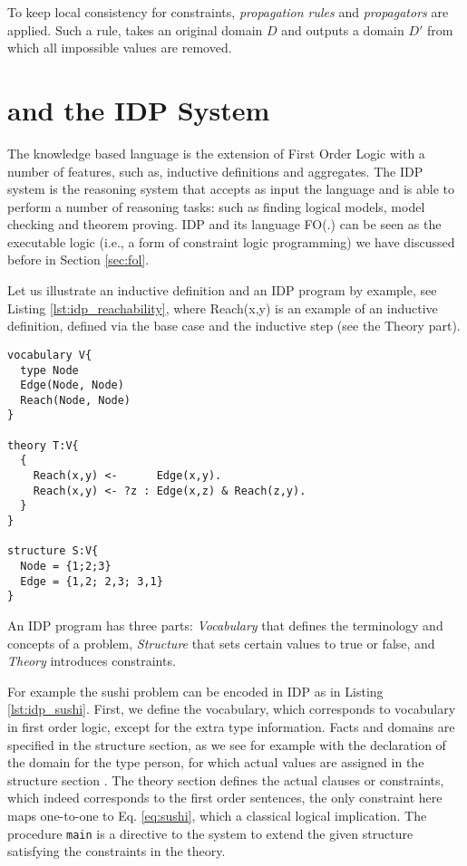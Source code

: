 To keep local consistency for constraints, \textit{propagation rules} and \textit{propagators} are applied. Such a rule, takes an original domain $D$ and outputs a domain $D'$ from which all impossible values are removed.

\pubrevend
\section{\fod and the IDP System}
The knowledge based language \fod is the extension of First Order Logic with a number of features, such as, inductive definitions and aggregates. The IDP system \parencite{idppaper} is the reasoning system that accepts as input the \fod language and is able to perform a number of reasoning tasks: such as finding logical models, model checking and theorem proving. \pubrev IDP and its language FO(.) can be seen as the executable logic (i.e., a form of constraint logic programming) we have discussed before in Section \ref{sec:fol}. \pubrevend

Let us illustrate an inductive definition and an IDP program by example, see Listing \ref{lst:idp_reachability}, where Reach(x,y) is an example of an inductive definition, defined via the base case and the inductive step (see the Theory part).
\begin{lstlisting}[caption=An example of an inductive definition in FO(.) and of an IDP program,label=lst:idp_reachability]
vocabulary V{
  type Node
  Edge(Node, Node)
  Reach(Node, Node)
}

theory T:V{
  { 
    Reach(x,y) <-      Edge(x,y).
    Reach(x,y) <- ?z : Edge(x,z) & Reach(z,y).
  }
}

structure S:V{
  Node = {1;2;3}
  Edge = {1,2; 2,3; 3,1} 
}
\end{lstlisting}

An IDP program has three parts: \textit{Vocabulary} that defines the terminology and concepts of a problem, \textit{Structure} that sets certain values to true or false, and \textit{Theory} introduces constraints.

For example the sushi problem can be encoded in IDP as in Listing \ref{lst:idp_sushi}. First, we define the vocabulary, which corresponds to vocabulary in first order logic, except for the extra type information. Facts and domains are specified in the structure section, as we see for example with the declaration of the domain for the type person, for which actual values are assigned in the structure section . The theory section defines the actual clauses or constraints, which indeed corresponds to the first order sentences, the only constraint here maps one-to-one to Eq. \ref{eq:sushi}, which a classical logical implication. The procedure \texttt{main} is a directive to the system to extend the given structure satisfying the constraints in the theory.

